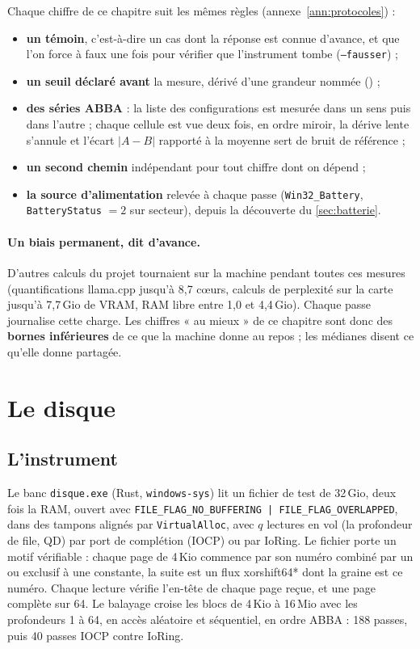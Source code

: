 Chaque chiffre de ce chapitre suit les mêmes règles (annexe~\ref{ann:protocoles}) :
\begin{itemize}
\item \textbf{un témoin}, c'est-à-dire un cas dont la réponse est connue d'avance, et que l'on force à faux une fois pour vérifier que l'instrument tombe (\texttt{--fausser}) ;
\item \textbf{un seuil déclaré avant} la mesure, dérivé d'une grandeur nommée () ;
\item \textbf{des séries ABBA} : la liste des configurations est mesurée dans un sens puis dans l'autre ; chaque cellule est vue deux fois, en ordre miroir, la dérive lente s'annule et l'écart $|A-B|$ rapporté à la moyenne sert de bruit de référence ;
\item \textbf{un second chemin} indépendant pour tout chiffre dont on dépend ;
\item \textbf{la source d'alimentation} relevée à chaque passe (\texttt{Win32\_Battery}, \texttt{BatteryStatus} $=2$ sur secteur), depuis la découverte du \cref{sec:batterie}.
\end{itemize}

\paragraph{Un biais permanent, dit d'avance.} D'autres calculs du projet tournaient sur la machine pendant toutes ces mesures (quantifications llama.cpp jusqu'à 8,7 cœurs, calculs de perplexité sur la carte jusqu'à 7,7\,Gio de VRAM, RAM libre entre 1,0 et 4,4\,Gio). Chaque passe journalise cette charge. Les chiffres « au mieux » de ce chapitre sont donc des \textbf{bornes inférieures} de ce que la machine donne au repos ; les médianes disent ce qu'elle donne partagée.

\section{Le disque}\label{sec:disque}

\subsection{L'instrument}

Le banc \texttt{disque.exe} (Rust, \texttt{windows-sys}) lit un fichier de test de 32\,Gio, deux fois la RAM, ouvert avec \texttt{FILE\_FLAG\_NO\_BUFFERING | FILE\_FLAG\_OVERLAPPED}, dans des tampons alignés par \texttt{VirtualAlloc}, avec $q$ lectures en vol (la profondeur de file, QD) par port de complétion (IOCP) ou par IoRing. Le fichier porte un motif vérifiable : chaque page de 4\,Kio commence par son numéro combiné par un ou exclusif à une constante, la suite est un flux xorshift64* dont la graine est ce numéro. Chaque lecture vérifie l'en-tête de chaque page reçue, et une page complète sur 64. Le balayage croise les blocs de 4\,Kio à 16\,Mio avec les profondeurs 1 à 64, en accès aléatoire et séquentiel, en ordre ABBA : 188 passes, puis 40 passes IOCP contre IoRing.

